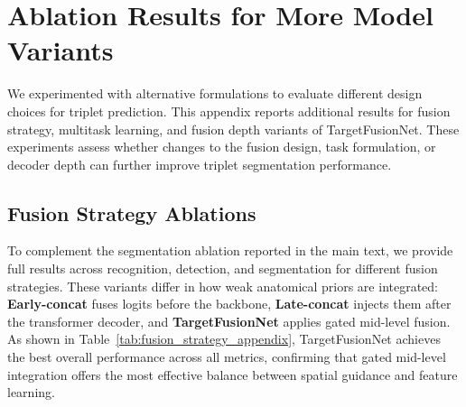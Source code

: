 \documentclass[11pt]{article}
\begin{document}
\section{Ablation Results for More Model Variants}
We experimented with alternative formulations to evaluate different design choices for triplet prediction. 
This appendix reports additional results for fusion strategy, multitask learning, and fusion depth variants of TargetFusionNet. 
These experiments assess whether changes to the fusion design, task formulation, or decoder depth can further improve triplet segmentation performance.


\subsection{Fusion Strategy Ablations}
To complement the segmentation ablation reported in the main text, we provide full results across recognition, detection, and segmentation for different fusion strategies. 
These variants differ in how weak anatomical priors are integrated: \textbf{Early-concat} fuses logits before the backbone, \textbf{Late-concat} injects them after the transformer decoder, and \textbf{TargetFusionNet} applies gated mid-level fusion. 
As shown in Table~\ref{tab:fusion_strategy_appendix}, TargetFusionNet achieves the best overall performance across all metrics, confirming that gated mid-level integration offers the most effective balance between spatial guidance and feature learning.
\end{document}
